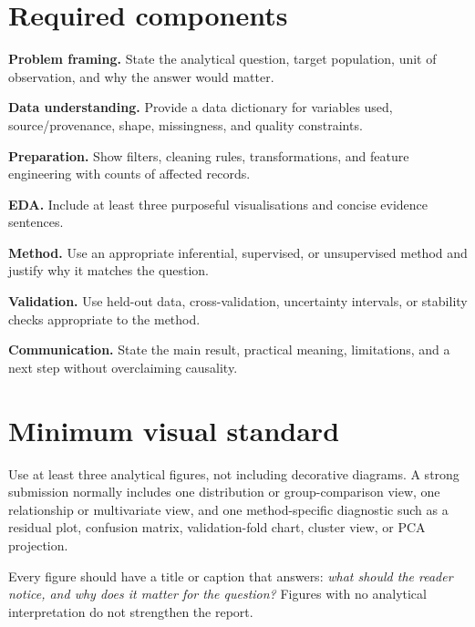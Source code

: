 \section{Required components}
\begin{mlsteps}
  \item \textbf{Problem framing.} State the analytical question, target population, unit of observation, and why the answer would matter.
  \item \textbf{Data understanding.} Provide a data dictionary for variables used, source/provenance, shape, missingness, and quality constraints.
  \item \textbf{Preparation.} Show filters, cleaning rules, transformations, and feature engineering with counts of affected records.
  \item \textbf{EDA.} Include at least three purposeful visualisations and concise evidence sentences.
  \item \textbf{Method.} Use an appropriate inferential, supervised, or unsupervised method and justify why it matches the question.
  \item \textbf{Validation.} Use held-out data, cross-validation, uncertainty intervals, or stability checks appropriate to the method.
  \item \textbf{Communication.} State the main result, practical meaning, limitations, and a next step without overclaiming causality.
\end{mlsteps}


\section{Minimum visual standard}
Use at least three analytical figures, not including decorative diagrams. A strong submission normally includes one distribution or group-comparison view, one relationship or multivariate view, and one method-specific diagnostic such as a residual plot, confusion matrix, validation-fold chart, cluster view, or PCA projection.

Every figure should have a title or caption that answers: \emph{what should the reader notice, and why does it matter for the question?} Figures with no analytical interpretation do not strengthen the report.


